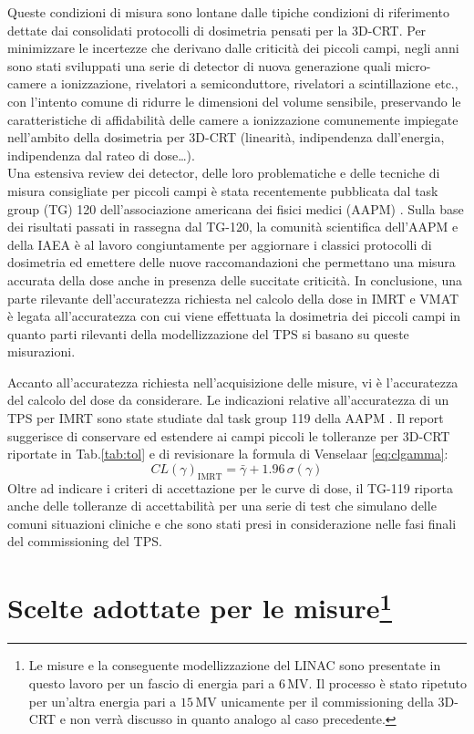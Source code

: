 Queste condizioni di misura sono lontane dalle tipiche condizioni di riferimento dettate dai consolidati protocolli di dosimetria \cite{Almond1999,Andreo2006} pensati per la 3D-CRT. Per minimizzare le incertezze che derivano dalle criticità dei piccoli campi, negli anni sono stati sviluppati una serie di detector di nuova generazione quali micro-camere a ionizzazione, rivelatori a semiconduttore, rivelatori a scintillazione etc., con l'intento comune di ridurre le dimensioni del volume sensibile, preservando le caratteristiche di affidabilità delle camere a ionizzazione comunemente impiegate nell'ambito della dosimetria per 3D-CRT (linearità, indipendenza dall'energia, indipendenza dal rateo di dose\ldots).\\
Una estensiva review dei detector, delle loro problematiche e delle tecniche di misura consigliate per piccoli campi è stata recentemente pubblicata dal task group (TG) 120 dell'associazione americana dei fisici medici (AAPM) \cite{Low2011}. Sulla base dei risultati passati in rassegna dal TG-120, la comunità scientifica dell'AAPM e della IAEA è al lavoro congiuntamente per aggiornare i classici protocolli di dosimetria ed emettere delle nuove raccomandazioni che permettano una misura accurata della dose anche in presenza delle succitate criticità. In conclusione, una parte rilevante dell'accuratezza richiesta nel calcolo della dose in IMRT e VMAT è legata all'accuratezza con cui viene effettuata la dosimetria dei piccoli campi in quanto parti rilevanti della modellizzazione del TPS si basano su queste misurazioni.

Accanto all'accuratezza richiesta nell'acquisizione delle misure, vi è l'accuratezza del calcolo del dose da considerare. Le indicazioni relative all'accuratezza di un TPS per IMRT sono state studiate dal task group 119 della AAPM \cite{Ezzell2009}. Il report suggerisce di conservare ed estendere ai campi piccoli le tolleranze per 3D-CRT riportate in Tab.\ref{tab:tol} e di revisionare la formula di Venselaar \eqref{eq:clgamma}:
\begin{equation}
CL(\gamma)_{\text{IMRT}} = \bar{\gamma} + 1.96\,\sigma(\gamma)
\end{equation}
Oltre ad indicare i criteri di accettazione per le curve di dose, il TG-119 riporta anche delle tolleranze di accettabilità per una serie di test che simulano delle comuni situazioni cliniche e che sono stati presi in considerazione nelle fasi finali del commissioning del TPS. 

\section[Scelte adottate per le misure]{Scelte adottate per le misure\protect\footnote{Le misure e la conseguente modellizzazione del LINAC sono presentate in questo lavoro per un fascio di energia pari a $6\,$MV. Il processo è stato ripetuto per un'altra energia pari a $15\,$MV unicamente per il commissioning della 3D-CRT e non verrà discusso in quanto analogo al caso precedente.}}

